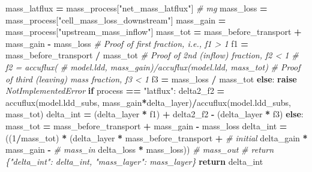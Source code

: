\documentclass[]{article}
\newenvironment{Shaded}{\begin{snugshade}}{\end{snugshade}}
\newcommand{\DecValTok}[1]{\textcolor[rgb]{0.00,0.00,0.81}{#1}}
\newcommand{\StringTok}[1]{\textcolor[rgb]{0.31,0.60,0.02}{#1}}
\newcommand{\CommentTok}[1]{\textcolor[rgb]{0.56,0.35,0.01}{\textit{#1}}}
\newcommand{\ControlFlowTok}[1]{\textcolor[rgb]{0.13,0.29,0.53}{\textbf{#1}}}
\newcommand{\OperatorTok}[1]{\textcolor[rgb]{0.81,0.36,0.00}{\textbf{#1}}}
\newcommand{\PreprocessorTok}[1]{\textcolor[rgb]{0.56,0.35,0.01}{\textit{#1}}}
\newcommand{\NormalTok}[1]{#1}
\begin{document}
\begin{Shaded}
\begin{Highlighting}[]
\NormalTok{        mass_latflux }\OperatorTok{=}\NormalTok{ mass_process[}\StringTok{"net_mass_latflux"}\NormalTok{]  }\CommentTok{# mg}
\NormalTok{        mass_loss }\OperatorTok{=}\NormalTok{ mass_process[}\StringTok{"cell_mass_loss_downstream"}\NormalTok{]}
\NormalTok{        mass_gain }\OperatorTok{=}\NormalTok{ mass_process[}\StringTok{"upstream_mass_inflow"}\NormalTok{]}
\NormalTok{        mass_tot }\OperatorTok{=}\NormalTok{ mass_before_transport }\OperatorTok{+}\NormalTok{ mass_gain }\OperatorTok{-}\NormalTok{ mass_loss}
        \CommentTok{# Proof of first fraction, i.e., f1 > 1}
\NormalTok{        f1 }\OperatorTok{=}\NormalTok{ mass_before_transport }\OperatorTok{/}\NormalTok{ mass_tot  }
        \CommentTok{# Proof of 2nd (inflow) fraction, f2 < 1}
        \CommentTok{# f2 = accuflux(}
        \CommentTok{#   model.ldd, mass_gain)/accuflux(model.ldd, mass_tot)  }
        \CommentTok{# Proof of third (leaving) mass fraction, f3 < 1}
\NormalTok{        f3 }\OperatorTok{=}\NormalTok{ mass_loss }\OperatorTok{/}\NormalTok{ mass_tot  }
    \ControlFlowTok{else}\NormalTok{:}
        \ControlFlowTok{raise} \PreprocessorTok{NotImplementedError}
    \ControlFlowTok{if}\NormalTok{ process }\OperatorTok{==} \StringTok{"latflux"}\NormalTok{:}
\NormalTok{        delta2_f2 }\OperatorTok{=}\NormalTok{ accuflux(model.ldd_subs, mass_gain}\OperatorTok{*}\NormalTok{delta_layer)}\OperatorTok{/}\NormalTok{accuflux(model.ldd_subs, mass_tot)}
\NormalTok{        delta_int }\OperatorTok{=}\NormalTok{ (delta_layer }\OperatorTok{*}\NormalTok{ f1) }\OperatorTok{+}\NormalTok{ delta2_f2 }\OperatorTok{-}\NormalTok{ (delta_layer }\OperatorTok{*}\NormalTok{ f3)}
    \ControlFlowTok{else}\NormalTok{:}
\NormalTok{        mass_tot }\OperatorTok{=}\NormalTok{ mass_before_transport }\OperatorTok{+}\NormalTok{ mass_gain }\OperatorTok{-}\NormalTok{ mass_loss}
\NormalTok{        delta_int }\OperatorTok{=}\NormalTok{ ((}\DecValTok{1}\OperatorTok{/}\NormalTok{mass_tot) }\OperatorTok{*}
\NormalTok{                     (delta_layer }\OperatorTok{*}\NormalTok{ mass_before_transport }\OperatorTok{+}  \CommentTok{# initial}
\NormalTok{                      delta_gain }\OperatorTok{*}\NormalTok{ mass_gain }\OperatorTok{-}  \CommentTok{# mass_in}
\NormalTok{                      delta_loss }\OperatorTok{*}\NormalTok{ mass_loss))  }\CommentTok{# mass_out}
    \CommentTok{# return \{"delta_int": delta_int, "mass_layer": mass_layer\}}
    \ControlFlowTok{return}\NormalTok{ delta_int}
                       
\end{Highlighting}
\end{Shaded}


\end{document}
